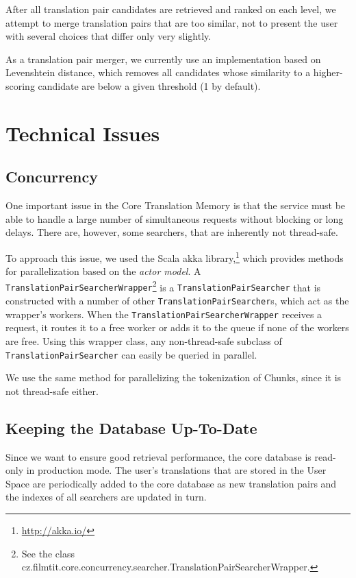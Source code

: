 After all translation pair candidates are retrieved and ranked on each level, we attempt to merge translation pairs that are too similar, not to present the user with several choices that differ only very slightly.

As a translation pair merger, we currently use an implementation based on Levenshtein distance, which removes all candidates whose similarity to a higher-scoring candidate are below a given threshold (1 by default).




\section{Technical Issues}

\subsection{Concurrency}

One important issue in the Core Translation Memory is that the service must be able to handle a large number of simultaneous requests without blocking or long delays. There are, however, some searchers, that are inherently not thread-safe.

To approach this issue, we used the Scala akka library,\footnote{\url{http://akka.io/}} which provides methods for parallelization based on the \emph{actor model}. A {\tt TranslationPairSearcherWrapper}\footnote{See  the class cz.filmtit.core.concurrency.searcher.TranslationPairSearcherWrapper.} is a {\tt TranslationPairSearcher} that is constructed with a number of other {\tt TranslationPairSearcher}s, which act as the wrapper's workers. When the {\tt TranslationPairSearcherWrapper} receives a request, it routes it to a free worker or adds it to the queue if none of the workers are free. Using this wrapper class, any non-thread-safe subclass of {\tt TranslationPairSearcher} can easily be queried in parallel.

We use the same method for parallelizing the tokenization of Chunks, since it is not thread-safe either.


\subsection{Keeping the Database Up-To-Date}

Since we want to ensure good retrieval performance, the core database is read-only in production mode. The user's translations that are stored in the User Space are periodically added to the core database as new translation pairs and the indexes of all searchers are updated in turn.




